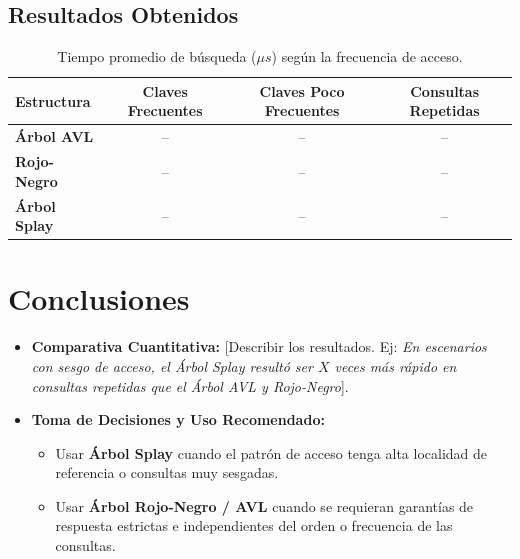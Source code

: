 \documentclass[11pt,a4paper]{article}
\begin{document}
\subsection{Resultados Obtenidos}


\begin{table}[h!]
    \centering
    \caption{Tiempo promedio de búsqueda ($\mu s$) según la frecuencia de acceso.}
    \label{tab:resultados_busqueda}
    \begin{tabular}{lccc}
        \toprule
        \textbf{Estructura} & \textbf{Claves Frecuentes} & \textbf{Claves Poco Frecuentes} & \textbf{Consultas Repetidas} \\
        \midrule
        \textbf{Árbol AVL} & -- & -- & -- \\
        \textbf{Rojo-Negro} & -- & -- & -- \\
        \textbf{Árbol Splay} & -- & -- & -- \\
        \bottomrule
    \end{tabular}
\end{table}

\section{Conclusiones}
\begin{itemize}
    \item \textbf{Comparativa Cuantitativa:} [Describir los resultados. Ej: \emph{En escenarios con sesgo de acceso, el Árbol Splay resultó ser $X$ veces más rápido en consultas repetidas que el Árbol AVL y Rojo-Negro}].
    \item \textbf{Toma de Decisiones y Uso Recomendado:}
    \begin{itemize}
        \item Usar \textbf{Árbol Splay} cuando el patrón de acceso tenga alta localidad de referencia o consultas muy sesgadas.
        \item Usar \textbf{Árbol Rojo-Negro / AVL} cuando se requieran garantías de respuesta estrictas e independientes del orden o frecuencia de las consultas.
    \end{itemize}
\end{itemize}
\end{document}

